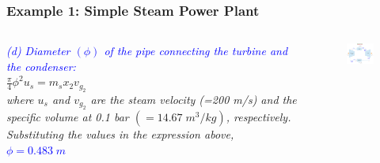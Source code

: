 \documentclass[10pt,compress]{beamer}
\begin{document}
\begin{frame}
 \frametitle{Example 1: Simple Steam Power Plant}
  \begin{columns}
   \begin{column}[c]{0.5\linewidth}
    {\it  
    \textcolor{blue}{(d) Diameter $\left(\phi\right)$ of the pipe connecting the turbine and the condenser:}\\
$\displaystyle\frac{\pi}{4}\phi^{2}u_{s}=m_{s}x_{2}v_{g_{2}}$\\
where $u_{s}$ and $v_{g_{2}}$ are the steam velocity (=200 m/s) and the specific volume at 0.1 bar $\left(=14.67\;m^{3}/kg\right)$, respectively. Substituting the values in the expression above,\\
\textcolor{blue}{$\phi=0.483\;m$}
}
   \end{column}

   \begin{column}[c]{0.5\linewidth}
    \begin{figure}%
     \begin{center}
      \includegraphics[width=6.25cm,clip]{./Pics/Rankine_Cycle_Exemple01}
     \end{center}
    \end{figure}  
   \end{column}
  \end{columns}

 \normalsize
\end{frame}
\end{document}

